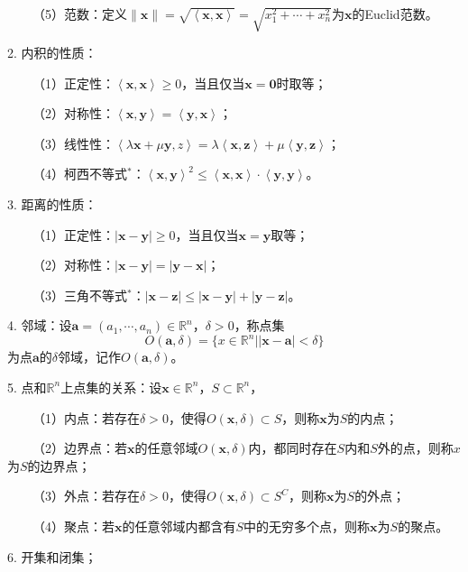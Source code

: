 ~~~~（5）范数：定义$\|\mathbf{x}\|=\sqrt{\left\langle\mathbf{x},\mathbf{x}\right\rangle}=\sqrt{x_1^2+\cdots+x_n^2}$为$\mathbf{x}$的Euclid范数。

2. 内积的性质：

~~~~（1）正定性：$\left\langle\mathbf{x},\mathbf{x}\right\rangle\geqslant 0$，当且仅当$\mathbf{x}=\mathbf{0}$时取等；

~~~~（2）对称性：$\left\langle\mathbf{x},\mathbf{y}\right\rangle=\left\langle\mathbf{y},\mathbf{x}\right\rangle$；

~~~~（3）线性性：$\left\langle\lambda\mathbf{x}+\mu\mathbf{y},z\right\rangle=\lambda\left\langle\mathbf{x},\mathbf{z}\right\rangle+\mu\left\langle\mathbf{y},\mathbf{z}\right\rangle$；

~~~~（4）柯西不等式$^*$：$\left\langle\mathbf{x},\mathbf{y}\right\rangle^2\leqslant \left\langle\mathbf{x},\mathbf{x}\right\rangle\cdot\left\langle\mathbf{y},\mathbf{y}\right\rangle$。

3. 距离的性质：

~~~~（1）正定性：$|\mathbf{x}-\mathbf{y}|\geqslant 0$，当且仅当$\mathbf{x}=\mathbf{y}$取等；

~~~~（2）对称性：$|\mathbf{x}-\mathbf{y}|=|\mathbf{y}-\mathbf{x}|$；

~~~~（3）三角不等式$^*$：$|\mathbf{x}-\mathbf{z}|\leqslant |\mathbf{x}-\mathbf{y}|+|\mathbf{y}-\mathbf{z}|$。

4. 邻域：设$\mathbf{a}=(a_1,\cdots,a_n)\in \mathbb{R}^n$，$\delta>0$，称点集
\begin{equation*}
    O(\mathbf{a},\delta)=\{x\in \mathbb{R}^n\Big| |\mathbf{x}-\mathbf{a}|<\delta\}
\end{equation*}
为点$\mathbf{a}$的$\delta$邻域，记作$O(\mathbf{a},\delta)$。

5. 点和$\mathbb{R}^n$上点集的关系：设$\mathbf{x}\in \mathbb{R}^n$，$S\subset \mathbb{R}^n$，

~~~~（1）内点：若存在$\delta>0$，使得$O(\mathbf{x},\delta)\subset S$，则称$\mathbf{x}$为$S$的内点；

~~~~（2）边界点：若$\mathbf{x}$的任意邻域$O(\mathbf{x},\delta)$内，都同时存在$S$内和$S$外的点，则称$x$为$S$的边界点；

~~~~（3）外点：若存在$\delta>0$，使得$O(\mathbf{x},\delta)\subset S^C$，则称$\mathbf{x}$为$S$的外点；

~~~~（4）聚点：若$\mathbf{x}$的任意邻域内都含有$S$中的无穷多个点，则称$\mathbf{x}$为$S$的聚点。

6. 开集和闭集；

